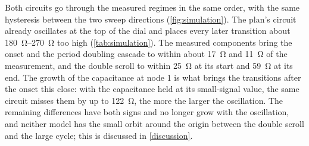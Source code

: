 Both circuits go through the measured regimes in the same order, with the same hysteresis between the two sweep directions (\cref{fig:simulation}). The plan's circuit already oscillates at the top of the dial and places every later transition about \qtyrange{180}{270}{\ohm} too high (\cref{tab:simulation}). The measured components bring the onset and the period doubling cascade to within about \qty{17}{\ohm} and \qty{11}{\ohm} of the measurement, and the double scroll to within \qty{25}{\ohm} at its start and \qty{59}{\ohm} at its end. The growth of the capacitance at node 1 is what brings the transitions after the onset this close: with the capacitance held at its small-signal value, the same circuit misses them by up to \qty{122}{\ohm}, the more the larger the oscillation. The remaining differences have both signs and no longer grow with the oscillation, and neither model has the small orbit around the origin between the double scroll and the large cycle; this is discussed in \cref{discussion}.

